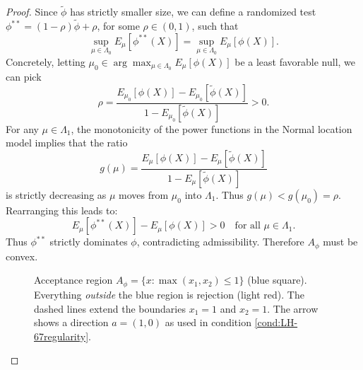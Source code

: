 \documentclass[12pt]{article}
\theoremstyle{definition}
\theoremstyle{remark}
\begin{document}
\begin{proof}
Since $\tilde\phi$ has strictly smaller size, we can define a randomized test $\phi^{**} = (1-\rho)\tilde\phi + \rho$, for some $\rho \in (0,1)$,
such that
\[
\sup_{\mu\in\Lambda_0}E_\mu[\phi^{**}(X)]
= \sup_{\mu\in\Lambda_0}E_\mu[\phi(X)].
\]
Concretely, letting $\mu_0 \in \arg\max_{\mu \in \Lambda_0} E_\mu[\phi(X)]$ be a least favorable null, we can pick
\begin{equation}\label{eq:rho_def} 
    \rho = \frac{E_{\mu_0}[\phi(X)] - E_{\mu_0}[\tilde\phi(X)]}{1 - E_{\mu_0}[\tilde\phi(X)]} > 0.
\end{equation}
For any $\mu \in \Lambda_1$, the monotonicity of the power functions in the Normal location model implies that the ratio
$$
g(\mu) = \frac{E_\mu[\phi(X)] - E_\mu[\tilde\phi(X)]}{1 - E_\mu[\tilde\phi(X)]}
$$
is strictly decreasing as $\mu$ moves from $\mu_0$ into $\Lambda_1$. Thus $g(\mu) < g(\mu_0) = \rho$.
Rearranging this leads to:
$$
E_\mu[\phi^{**}(X)] - E_\mu[\phi(X)] > 0 \quad \text{for all } \mu \in \Lambda_1.
$$
Thus $\phi^{**}$ strictly dominates $\phi$, contradicting admissibility. Therefore $A_\phi$ must be convex.

\begin{figure}[h!]
\centering
{}
\caption{Acceptance region $A_\phi=\{x:\max(x_1,x_2)\le 1\}$ (blue square). 
Everything \emph{outside} the blue region is rejection (light red). 
The dashed lines extend the boundaries $x_1=1$ and $x_2=1$. 
The arrow shows a direction $a=(1,0)$ as used in condition \eqref{cond:LH-67regularity}.}\label{fig:ray}
\end{figure}


\end{proof}
\end{document}
